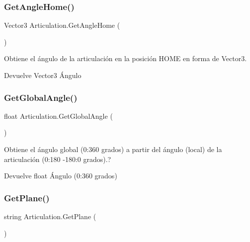 \subsubsection{\texorpdfstring{GetAngleHome()}{GetAngleHome()}}
{\footnotesize\ttfamily Vector3 Articulation.\+Get\+Angle\+Home (\begin{DoxyParamCaption}{ }\end{DoxyParamCaption})\hspace{0.3cm}{\ttfamily [inline]}}

Obtiene el ángulo de la articulación en la posición H\+O\+ME en forma de Vector3. \begin{DoxyReturn}{Devuelve}
Vector3 Ángulo 
\end{DoxyReturn}
\mbox{\label{class_articulation_ac60e77664f8666756cde14a3947a8306}} 
\subsubsection{\texorpdfstring{GetGlobalAngle()}{GetGlobalAngle()}}
{\footnotesize\ttfamily float Articulation.\+Get\+Global\+Angle (\begin{DoxyParamCaption}{ }\end{DoxyParamCaption})\hspace{0.3cm}{\ttfamily [inline]}}

Obtiene el ángulo global (0\+:360 grados) a partir del ángulo (local) de la articulación (0\+:180 -\/180\+:0 grados).? \begin{DoxyReturn}{Devuelve}
float Ángulo (0\+:360 grados) 
\end{DoxyReturn}
\mbox{\label{class_articulation_ac22a47cd879d9867137cf705070dfb7b}} 
\subsubsection{\texorpdfstring{GetPlane()}{GetPlane()}}
{\footnotesize\ttfamily string Articulation.\+Get\+Plane (\begin{DoxyParamCaption}{ }\end{DoxyParamCaption})\hspace{0.3cm}{\ttfamily [inline]}}

